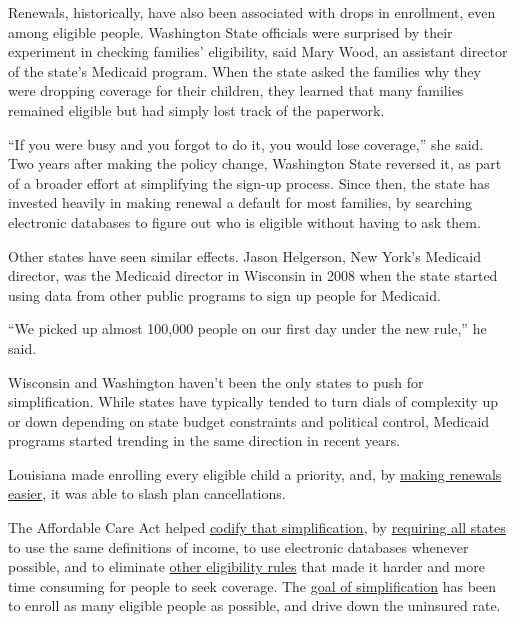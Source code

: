 Renewals, historically, have also been associated with drops in
enrollment, even among eligible people. Washington State officials were
surprised by their experiment in checking families' eligibility, said
Mary Wood, an assistant director of the state's Medicaid program. When
the state asked the families why they were dropping coverage for their
children, they learned that many families remained eligible but had
simply lost track of the paperwork.

``If you were busy and you forgot to do it, you would lose coverage,''
she said. Two years after making the policy change, Washington State
reversed it, as part of a broader effort at simplifying the sign-up
process. Since then, the state has invested heavily in making renewal a
default for most families, by searching electronic databases to figure
out who is eligible without having to ask them.

Other states have seen similar effects. Jason Helgerson, New York's
Medicaid director, was the Medicaid director in Wisconsin in 2008 when
the state started using data from other public programs to sign up
people for Medicaid.

``We picked up almost 100,000 people on our first day under the new
rule,'' he said.

Wisconsin and Washington haven't been the only states to push for
simplification. While states have typically tended to turn dials of
complexity up or down depending on state budget constraints and
political control, Medicaid programs started trending in the same
direction in recent years.

Louisiana made enrolling every eligible child a priority, and, by
\href{http://ccf.georgetown.edu/wp-content/uploads/2008/03/Louisiana-Expansion-Simplification-Outreach.pdf}{making
renewals easier}, it was able to slash plan cancellations.

The Affordable Care Act helped
\href{https://www.healthaffairs.org/do/10.1377/hpb20110127.77698/full/}{codify
that simplification}, by
\href{https://kaiserfamilyfoundation.files.wordpress.com/2013/04/8391.pdf}{requiring
all states} to use the same definitions of income, to use electronic
databases whenever possible, and to eliminate
\href{http://ccf.georgetown.edu/wp-content/uploads/2008/03/Louisiana-Expansion-Simplification-Outreach.pdf}{other
eligibility rules} that made it harder and more time consuming for
people to seek coverage. The
\href{https://www.nytimes3xbfgragh.onion/2015/01/29/upshot/the-goal-was-simplicity-instead-theres-a-many-headed-medicaid.html}{goal
of simplification} has been to enroll as many eligible people as
possible, and drive down the uninsured rate.

